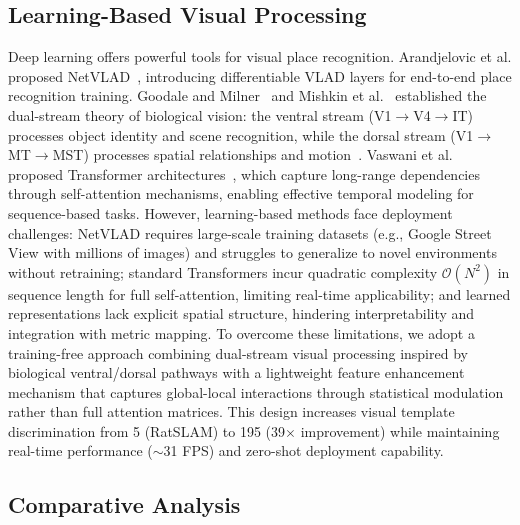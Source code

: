 \subsection{Learning-Based Visual Processing}
\label{sec:related_learning}

Deep learning offers powerful tools for visual place recognition. Arandjelovic et al. proposed NetVLAD~\cite{Arandjelovic2016}, introducing differentiable VLAD layers for end-to-end place recognition training. Goodale and Milner~\cite{Goodale1992} and Mishkin et al.~\cite{Mishkin1983} established the dual-stream theory of biological vision: the ventral stream (V1$\rightarrow$V4$\rightarrow$IT) processes object identity and scene recognition, while the dorsal stream (V1$\rightarrow$MT$\rightarrow$MST) processes spatial relationships and motion~\cite{DiCarlo2012, Duffy1998}. Vaswani et al. proposed Transformer architectures~\cite{Vaswani2017}, which capture long-range dependencies through self-attention mechanisms, enabling effective temporal modeling for sequence-based tasks. However, learning-based methods face deployment challenges: NetVLAD requires large-scale training datasets (e.g., Google Street View with millions of images) and struggles to generalize to novel environments without retraining; standard Transformers incur quadratic complexity $\mathcal{O}(N^2)$ in sequence length for full self-attention, limiting real-time applicability; and learned representations lack explicit spatial structure, hindering interpretability and integration with metric mapping. To overcome these limitations, we adopt a training-free approach combining dual-stream visual processing inspired by biological ventral/dorsal pathways with a lightweight feature enhancement mechanism that captures global-local interactions through statistical modulation rather than full attention matrices. This design increases visual template discrimination from 5 (RatSLAM) to 195 (39$\times$ improvement) while maintaining real-time performance ($\sim$31 FPS) and zero-shot deployment capability.

\subsection{Comparative Analysis}
\label{sec:related_compare}

